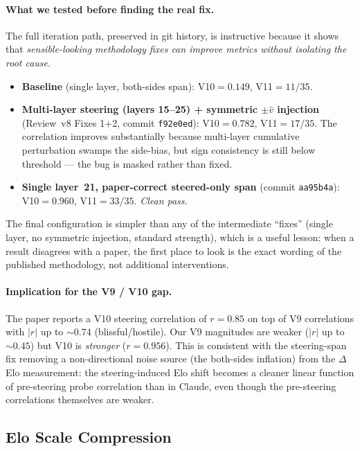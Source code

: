 \documentclass[11pt,a4paper]{article}
\begin{document}
\paragraph{What we tested before finding the real fix.}
The full iteration path, preserved in git history, is instructive
because it shows that \emph{sensible-looking methodology fixes can
improve metrics without isolating the root cause}.
\begin{itemize}[nosep]
  \item \textbf{Baseline} (single layer, both-sides span):
    V10$=0.149$, V11$=11/35$.
  \item \textbf{Multi-layer steering (layers 15--25) + symmetric
    $\pm\hat{v}$ injection} (Review~v8 Fixes 1+2, commit
    \texttt{f92e0ed}): V10$=0.782$, V11$=17/35$.  The correlation
    improves substantially because multi-layer cumulative
    perturbation swamps the side-bias, but sign consistency is still
    below threshold --- the bug is masked rather than fixed.
  \item \textbf{Single layer~21, paper-correct steered-only span}
    (commit \texttt{aa95b4a}): V10$=0.960$, V11$=33/35$.
    \emph{Clean pass.}
\end{itemize}
The final configuration is simpler than any of the intermediate
``fixes'' (single layer, no symmetric injection, standard strength),
which is a useful lesson: when a result disagrees with a paper, the
first place to look is the exact wording of the published
methodology, not additional interventions.

\paragraph{Implication for the V9 / V10 gap.}
The paper reports a V10 steering correlation of $r{=}0.85$ on top of
V9 correlations with $|r|$ up to $\sim 0.74$ (blissful/hostile).  Our
V9 magnitudes are weaker ($|r|$ up to $\sim 0.45$) but V10 is
\emph{stronger} ($r{=}0.956$).  This is consistent with the
steering-span fix removing a non-directional noise source (the
both-sides inflation) from the $\Delta$Elo measurement: the
steering-induced Elo shift becomes a cleaner linear function of
pre-steering probe correlation than in Claude, even though the
pre-steering correlations themselves are weaker.

\subsection{Elo Scale Compression}
\label{sec:delta-scale}
\end{document}
